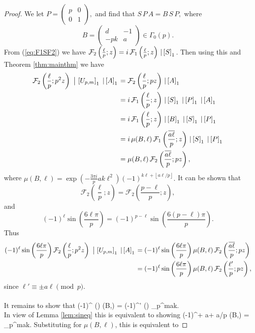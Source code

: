 \documentclass[12pt]{amsart}
\theoremstyle{definition}
\theoremstyle{remark}
\numberwithin{equation}{section}
\newcommand{\Parans}[1]{\left(#1\right)}
\newcommand\Fell[4]{\mathcal{F}_{#1}\left(\frac{#2}{#3};#4\right)}
\newcommand\FL[1]{\left\lfloor#1\right\rfloor}
\newcommand\strokeb[2]{\,\left\arrowvert\,\left[#1\right]_#2\right.}
\newcommand\thm[1]{\ref{thm:#1}}
\newcommand\lem[1]{\ref{lem:#1}}
\newcommand\eqn[1]{(\ref{eq:#1})}
\begin{document}
\begin{proof}
We let $P = \begin{pmatrix} p & 0 \\ 0 & 1\end{pmatrix},$ and find that $S\, P\, A = B \, S\, P,$
where
$$
B = \begin{pmatrix} d & -1 \\ -pk & a\end{pmatrix}
\in \Gamma_0(p).
$$
From \eqn{F1SF2} we have
$\Fell{2}{\ell}{p}{z}  = i\,\Fell{1}{\ell}{p}{z} \strokeb{S}{1}$.
Then using this and Theorem \thm{mainthm} we have
\begin{align*}
\Fell{2}{\ell}{p}{p^2z} \strokeb{U_{p,m}}{1} \strokeb{A}{1} &=\Fell{2}{\ell}{p}{pz} \strokeb{A}{1}
\\
&=i\,\Fell{1}{\ell}{p}{z} \strokeb{S}{1} \strokeb{P}{1} \strokeb{A}{1}
\\
&=i\,\Fell{1}{\ell}{p}{z} \strokeb{B}{1} \strokeb{S}{1} \strokeb{P}{1}
\\
&=i\,\mu(B,\ell)\, \Fell{1}{\overline{a\ell}}{p}{z} \strokeb{S}{1} \strokeb{P}{1}
\\
&=\mu(B,\ell)\, \Fell{2}{\overline{a\ell}}{p}{pz},
\end{align*}
where
$\mu(B,\ell) = \exp( -\tfrac{3 \pi i}{p} a k \ell^2) (-1)^{k\ell + \FL{a\ell/p}}.$
It can be shown that
$$
\Fell{2}{\ell}{p}{z} 
=
\Fell{2}{p-\ell}{p}{z},
$$
and
$$
(-1)^{\ell} \sin\Parans{\frac{6\ell\pi}{p}}
=
(-1)^{p-\ell} \sin\Parans{\frac{6(p-\ell)\pi}{p}}.
$$
Thus
\begin{align*}
(-1)^{\ell} \sin\Parans{\frac{6\ell\pi}{p}}\Fell{2}{\ell}{p}{p^2z} \strokeb{U_{p,m}}{1} \strokeb{A}{1}
&=(-1)^{\ell} \sin\Parans{\frac{6\ell\pi}{p}}\mu(B,\ell)\, \Fell{2}{\overline{a\ell}}{p}{pz}
\\
&=(-1)^{\ell} \sin\Parans{\frac{6\ell\pi}{p}}\mu(B,\ell)\, \Fell{2}{\ell'}{p}{pz},
\end{align*}
since $\ell' \equiv \pm a\ell \pmod{p}$.\\\\
It remains to show that
\beq
(-1)^{\ell} \sin\Parans{}
	 \mu(B,\ell)
=
(-1)^{\ell'} \sin\Parans{}
\zeta_p^{mak}.
\label{eq:muzetaid}
\eeq
\noindent\\
In view of Lemma \lem{sineq} this is equivalent to showing
\beq
(-1)^{\ell  + a\ell + \FL{a\ell/p}} 
	 \mu(B,\ell)
=
\zeta_p^{mak}.
\label{eq:muzetaidB}
\eeq
Substituting for $\mu(B,\ell)$, this is equivalent to


\end{proof}
\end{document}
